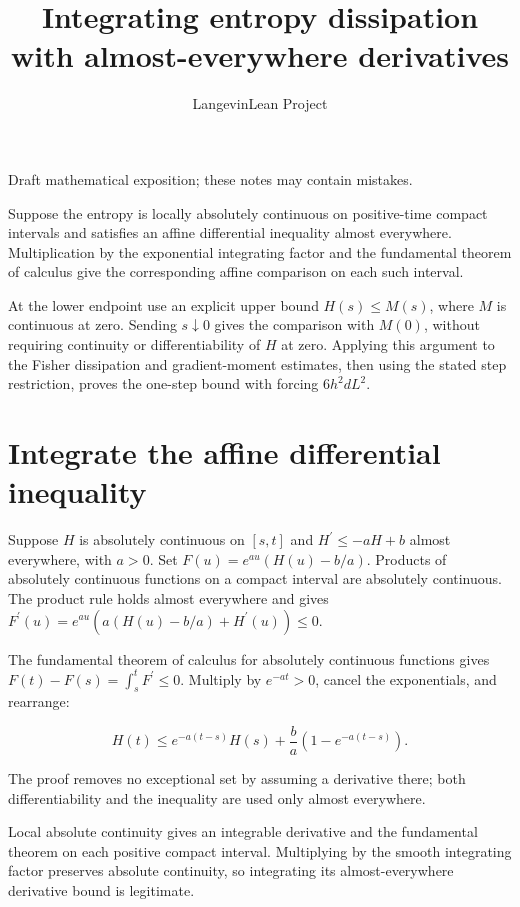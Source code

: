 \documentclass[11pt,a4paper]{article}
\title{\texorpdfstring{Integrating entropy dissipation with almost-everywhere derivatives}{Integrating entropy dissipation with almost-everywhere derivatives}}
\author{LangevinLean Project}
\date{}
\begin{document}
\maketitle
Draft mathematical exposition; these notes may contain mistakes.


Suppose the entropy is locally absolutely continuous on positive-time compact intervals and satisfies an affine differential inequality almost everywhere. Multiplication by the exponential integrating factor and the fundamental theorem of calculus give the corresponding affine comparison on each such interval.



At the lower endpoint use an explicit upper bound \(H(s)\le M(s)\), where \(M\) is continuous at zero. Sending \(s\downarrow0\) gives the comparison with \(M(0)\), without requiring continuity or differentiability of \(H\) at zero. Applying this argument to the Fisher dissipation and gradient-moment estimates, then using the stated step restriction, proves the one-step bound with forcing \(6h^2dL^2\).


\section{\texorpdfstring{Integrate the affine differential inequality}{Integrate the affine differential inequality}}


Suppose \(H\) is absolutely continuous on \([s,t]\) and \(H^{\prime}\le-aH+b\) almost everywhere, with \(a>0\). Set \(F(u)=e^{au}(H(u)-b/a)\). Products of absolutely continuous functions on a compact interval are absolutely continuous. The product rule holds almost everywhere and gives \(F^{\prime}(u)=e^{au}(a(H(u)-b/a)+H^{\prime}(u))\le0\).



The fundamental theorem of calculus for absolutely continuous functions gives \(F(t)-F(s)=\int_s^tF^{\prime}\le0\). Multiply by \(e^{-at}>0\), cancel the exponentials, and rearrange:

\[H(t)\le e^{-a(t-s)}H(s)+\frac ba(1-e^{-a(t-s)}).\]

The proof removes no exceptional set by assuming a derivative there; both differentiability and the inequality are used only almost everywhere.



Local absolute continuity gives an integrable derivative and the fundamental theorem on each positive compact interval. Multiplying by the smooth integrating factor preserves absolute continuity, so integrating its almost-everywhere derivative bound is legitimate.
\end{document}
